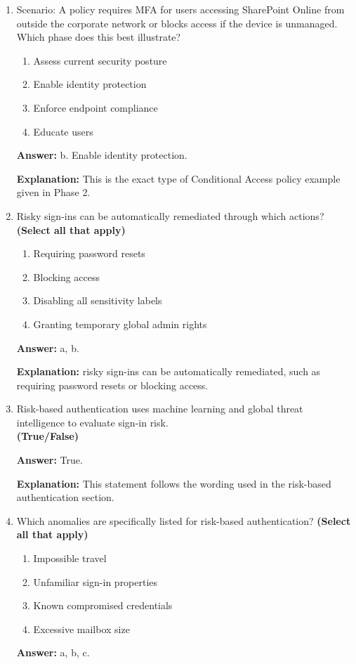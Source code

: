 \documentclass[10pt]{article}
\begin{document}
\begin{enumerate}[leftmargin=*]
\textbf{Explanation:} these four factors when describing Conditional Access in Phase 2.

\item Scenario: A policy requires MFA for users accessing SharePoint Online from outside the corporate network or blocks access if the device is unmanaged. Which phase does this best illustrate?
\begin{enumerate}[label=\alph*., leftmargin=1.5em]
\item Assess current security posture
\item Enable identity protection
\item Enforce endpoint compliance
\item Educate users
\end{enumerate}
\textbf{Answer:} b. Enable identity protection.

\textbf{Explanation:} This is the exact type of Conditional Access policy example given in Phase 2.

\item Risky sign-ins can be automatically remediated through which actions? \textbf{(Select all that apply)}
\begin{enumerate}[label=\alph*., leftmargin=1.5em]
\item Requiring password resets
\item Blocking access
\item Disabling all sensitivity labels
\item Granting temporary global admin rights
\end{enumerate}
\textbf{Answer:} a, b.

\textbf{Explanation:} risky sign-ins can be automatically remediated, such as requiring password resets or blocking access.

\item Risk-based authentication uses machine learning and global threat intelligence to evaluate sign-in risk.\\
\textbf{(True/False)}

\textbf{Answer:} True.

\textbf{Explanation:} This statement follows the wording used in the risk-based authentication section.

\item Which anomalies are specifically listed for risk-based authentication? \textbf{(Select all that apply)}
\begin{enumerate}[label=\alph*., leftmargin=1.5em]
\item Impossible travel
\item Unfamiliar sign-in properties
\item Known compromised credentials
\item Excessive mailbox size
\end{enumerate}
\textbf{Answer:} a, b, c.


\end{enumerate}
\end{document}
